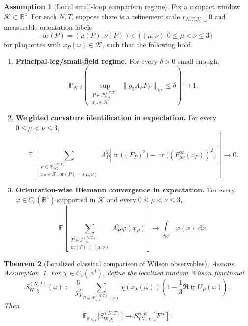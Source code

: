 \documentclass[11pt]{article}
\newtheorem{theorem}{Theorem}[section]
\theoremstyle{definition}
\newtheorem{assumption}[theorem]{Assumption}
\theoremstyle{remark}
\newcommand{\R}{\mathbb R}
\newcommand{\E}{\mathbb E}
\newcommand{\mcP}{\mathcal P}
\newcommand{\mcK}{\mathcal K}
\newcommand{\dd}{\,\mathrm d}
\newcommand{\tr}{\operatorname{tr}}
\begin{document}
\begin{assumption}[Local small-loop comparison regime]
\label{ass:local-comparison-regime}
Fix a compact window \(\mcK\subset\R^4\). For each \(N,T\), suppose there is a
refinement scale \(r_{N,T,\mcK}\downarrow0\) and measurable orientation labels
\[
\mathrm{or}(P)=(\mu(P),\nu(P))\in\{(\mu,\nu):0\le\mu<\nu\le3\}
\]
for plaquettes with \(x_P(\omega)\in\mcK\), such that the following hold.
\begin{enumerate}[leftmargin=1.5em,label=\textnormal{(\roman*)}]
\item \textbf{Principal-log/small-field regime.}
For every \(\delta>0\) small enough,
\[
\mathbb P_{N,T}\!\left(
\sup_{\substack{P\in\mcP_{\mathrm{FG}}^{(N,T)}\\ x_P\in\mcK}}
\|g_3A_PF_P\|_{\mathrm{op}}\le\delta
\right)\longrightarrow1.
\]
\item \textbf{Weighted curvature identification in expectation.}
For every \(0\le\mu<\nu\le3\),
\[
\E\!\left[
\sum_{\substack{P\in\mcP_{\mathrm{FG}}^{(N,T)}\\
x_P\in\mcK,\ \mathrm{or}(P)=(\mu,\nu)}}
A_P^2
\left|
\tr\!\bigl((F_P)^2\bigr)
-\tr\!\bigl((F_{\mu\nu}^\infty(x_P))^2\bigr)
\right|
\right]
\longrightarrow0.
\]
\item \textbf{Orientation-wise Riemann convergence in expectation.}
For every \(\varphi\in C_c(\R^4)\) supported in \(\mcK\) and every
\(0\le\mu<\nu\le3\),
\[
\E\!\left[
\sum_{\substack{P\in\mcP_{\mathrm{FG}}^{(N,T)}\\ \mathrm{or}(P)=(\mu,\nu)}}
A_P^2\,\varphi(x_P)
\right]
\longrightarrow
\int_{\R^4}\varphi(x)\,\dd x.
\]
\end{enumerate}
\end{assumption}

\begin{theorem}[Localized classical comparison of Wilson observables]
\label{thm:continuum-wilson}
Assume Assumption~\ref{ass:local-comparison-regime}. For \(\chi\in C_c(\R^4)\),
define the localized random Wilson functional
\[
S_{\mathrm W,\chi}^{(N,T)}(\omega)
:=
\frac{6}{g_3^2}
\sum_{P\in\mcP_{\mathrm{FG}}^{(N,T)}(\omega)}
\chi(x_P(\omega))
\left(
1-\frac13\Re\tr U_P(\omega)
\right).
\]
Then
\[
\E_{\mathbb P_{N,T}}\bigl[S_{\mathrm W,\chi}^{(N,T)}\bigr]
\longrightarrow
S_{\mathrm{YM},\chi}^{\mathrm{cont}}[F^\infty].
\]
\end{theorem}
\end{document}
